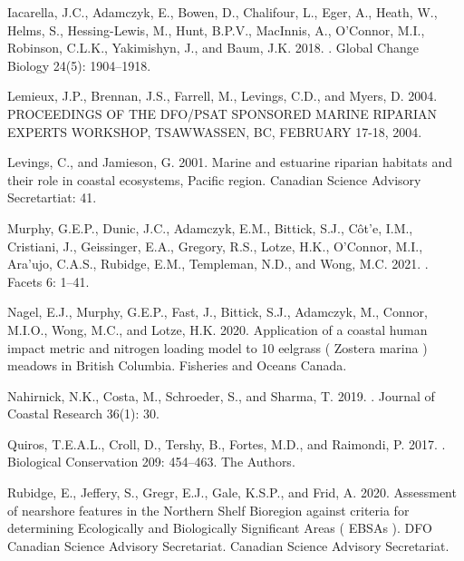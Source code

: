\documentclass[12pt]{article}\usepackage[]{graphicx}\usepackage[]{color}
\begin{document}
\begin{CSLReferences}{1}{0}
%
Iacarella, J.C., Adamczyk, E., Bowen, D., Chalifour, L., Eger, A., Heath, W., Helms, S., Hessing-Lewis, M., Hunt, B.P.V., MacInnis, A., O'Connor, M.I., Robinson, C.L.K., Yakimishyn, J., and Baum, J.K. 2018. . Global Change Biology 24(5): 1904--1918.

%
Lemieux, J.P., Brennan, J.S., Farrell, M., Levings, C.D., and Myers, D. 2004. {PROCEEDINGS OF THE DFO}/{PSAT SPONSORED MARINE RIPARIAN EXPERTS WORKSHOP}, {TSAWWASSEN}, {BC}, {FEBRUARY} 17-18, 2004.

%
Levings, C., and Jamieson, G. 2001. Marine and estuarine riparian habitats and their role in coastal ecosystems, {Pacific} region. Canadian Science Advisory Secretartiat: 41.

%
Murphy, G.E.P., Dunic, J.C., Adamczyk, E.M., Bittick, S.J., Côt'e, I.M., Cristiani, J., Geissinger, E.A., Gregory, R.S., Lotze, H.K., O'Connor, M.I., Ara'ujo, C.A.S., Rubidge, E.M., Templeman, N.D., and Wong, M.C. 2021. . Facets 6: 1--41.

%
Nagel, E.J., Murphy, G.E.P., Fast, J., Bittick, S.J., Adamczyk, M., Connor, M.I.O., Wong, M.C., and Lotze, H.K. 2020. Application of a coastal human impact metric and nitrogen loading model to 10 eelgrass ( {Zostera} marina ) meadows in {British Columbia}. {Fisheries and Oceans Canada}.

%
Nahirnick, N.K., Costa, M., Schroeder, S., and Sharma, T. 2019. . Journal of Coastal Research 36(1): 30.

%
Quiros, T.E.A.L., Croll, D., Tershy, B., Fortes, M.D., and Raimondi, P. 2017. . Biological Conservation 209: 454--463. {The Authors}.

%
Rubidge, E., Jeffery, S., Gregr, E.J., Gale, K.S.P., and Frid, A. 2020. Assessment of nearshore features in the {Northern Shelf Bioregion} against criteria for determining {Ecologically} and {Biologically Significant Areas} ( {EBSAs} ). DFO Canadian Science Advisory Secretariat. {Canadian Science Advisory Secretariat}.


\end{CSLReferences}
\end{document}
